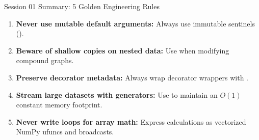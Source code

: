 \begin{frame}{Session 01 Summary: 5 Golden Engineering Rules}
  \begin{tcolorbox}[enhanced,arc=1.4mm,boxrule=.4pt,colback=UpGradMist,colframe=UpGradRule,left=3.5mm,right=3.5mm,top=1.8mm,bottom=1.8mm]
    \footnotesize
    \begin{enumerate}\setlength{\itemsep}{0.05cm}
      \item \textbf{Never use mutable default arguments:} Always use immutable sentinels ().
      \item \textbf{Beware of shallow copies on nested data:} Use  when modifying compound graphs.
      \item \textbf{Preserve decorator metadata:} Always wrap decorator wrappers with .
      \item \textbf{Stream large datasets with generators:} Use  to maintain an $O(1)$ constant memory footprint.
      \item \textbf{Never write  loops for array math:} Express calculations as vectorized NumPy ufuncs and broadcasts.
    \end{enumerate}
  \end{tcolorbox}
  \vfill
\end{frame}


